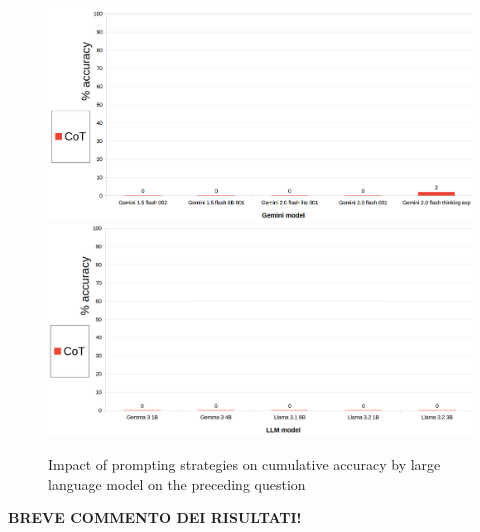 \documentclass[12pt]{article}
\begin{document}
\begin{figure}[H]
    \centering
            \includegraphics[width=1\textwidth]{q302Gemini.png}
            \includegraphics[width=1\textwidth]{q302Other.png}
    \caption[Accuracy on Question 14 by LLM]{Impact of prompting strategies on cumulative accuracy by large language model on the preceding question}
    \end{figure} 
\textbf{BREVE COMMENTO DEI RISULTATI!}

\vspace{1cm}
\end{document}

